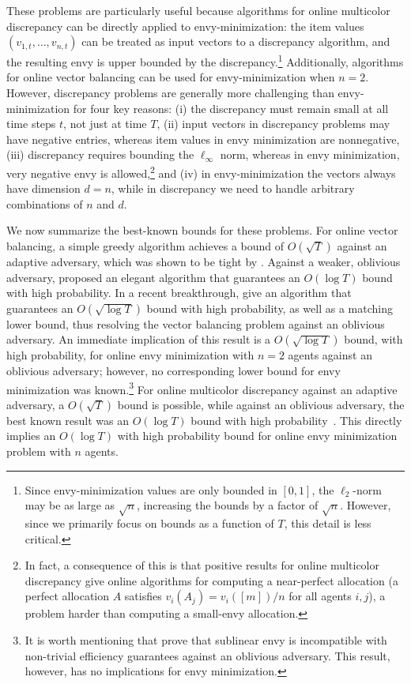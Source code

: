 These problems are particularly useful because algorithms for online multicolor discrepancy can be directly applied to envy-minimization: the item values $(v_{1, t}, \ldots, v_{n, t})$ can be treated as input vectors to a discrepancy algorithm, and the resulting envy is upper bounded by the discrepancy.\footnote{Since envy-minimization values are only bounded in $[0, 1]$, the $\ell_2$-norm may be as large as $\sqrt{n}$, increasing the bounds by a factor of $\sqrt{n}$. However, since we primarily focus on bounds as a function of $T$, this detail is less critical.}  Additionally, algorithms for online vector balancing can be used for envy-minimization when $n = 2$.
However, discrepancy problems are generally more challenging than envy-minimization for four key reasons: (i) the discrepancy must remain small at all time steps $t$, not just at time $T$, (ii) input vectors in discrepancy problems may have negative entries, whereas item values in envy minimization are nonnegative, (iii) discrepancy requires bounding the $\ell_{\infty}$ norm, whereas in envy minimization, very negative envy is allowed,\footnote{In fact, a consequence of this is that positive results for online multicolor discrepancy give online algorithms for computing a near-perfect allocation (a perfect allocation $A$ satisfies $v_i(A_j) = v_{i}([m])/n$ for all agents $i,j$), a problem harder than computing a small-envy allocation.} and (iv) in envy-minimization the vectors always have dimension $d=n$, while in discrepancy we need to handle arbitrary combinations of $n$ and $d$.

We now summarize the best-known bounds for these problems.
For online vector balancing, a simple greedy algorithm achieves a bound of $O(\sqrt{T})$ against an adaptive adversary, which was shown to be tight by \citet{spencer1977balancing,spencer1994ten}. Against a weaker, oblivious adversary, \citet{alweiss2021discrepancy} proposed an elegant algorithm that guarantees an $O(\log T)$ bound with high probability. In a recent breakthrough, \citet{kulkarni2024optimal} give an algorithm that guarantees an $O(\sqrt{\log T})$ bound with high probability, as well as a matching lower bound, thus resolving the vector balancing problem against an oblivious adversary.
An immediate implication of this result is a $O(\sqrt{\log T})$ bound, with high probability, for online envy minimization with $n=2$ agents against an oblivious adversary; however, no corresponding lower bound for envy minimization was known.\footnote{It is worth mentioning that \cite{benade2024fair} prove that sublinear envy is incompatible with non-trivial efficiency guarantees against an oblivious adversary. This result, however, has no implications for envy minimization.} For online multicolor discrepancy against an adaptive adversary, a $O(\sqrt{T})$ bound is possible, while against an oblivious adversary, the best known result was an $O(\log T)$ bound with high probability~\cite{alweiss2021discrepancy}. This directly implies an $O(\log T)$ with high probability bound for online envy minimization problem with $n$ agents.





